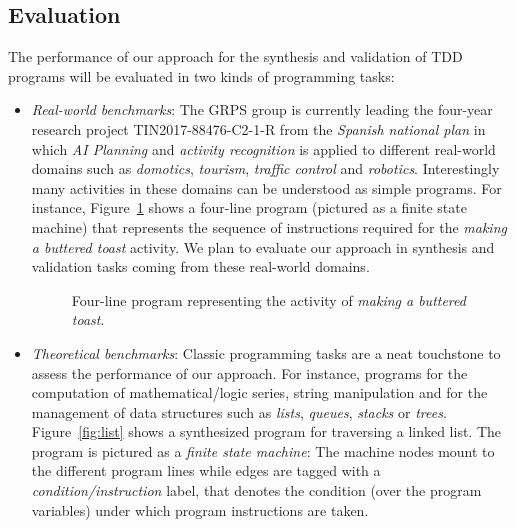 \documentclass[10pt,a4paper]{paper}
\begin{document}
\subsection{Evaluation}
\label{sec:evaluation}
The performance of our approach for the synthesis and validation of TDD programs will be evaluated in two kinds of programming tasks:
\begin{itemize}
\item {\em Real-world benchmarks}: The GRPS group is currently leading the four-year research project TIN2017-88476-C2-1-R from the {\em Spanish national plan} in which {\em AI Planning} and {\em activity recognition} is applied to different real-world domains such as {\em domotics}, {\em tourism}, {\em traffic control} and {\em robotics}. Interestingly many activities in these domains can be understood as simple programs. For instance, Figure~\ref{fig:activity} shows a four-line program (pictured as a finite state machine) that represents the sequence of instructions required for the {\em making a buttered toast} activity. We plan to evaluate our approach in synthesis and validation tasks coming from these real-world domains. 

\begin{figure}[hbt!]
\begin{center}
\end{center}
\caption{\small Four-line program representing the activity of {\em making a buttered toast}.}
\label{fig:activity}
\end{figure}


\item {\em Theoretical benchmarks}: Classic programming tasks are a neat touchstone to assess the performance of our approach. For instance, programs for the computation of mathematical/logic series, string manipulation and for the management of data structures such as {\em lists}, {\em queues}, {\em stacks} or {\em trees}. Figure~\ref{fig:list} shows a synthesized program for traversing a linked list. The program is pictured as a {\em finite state machine}: The machine nodes mount to the different program lines while edges are tagged with a {\em condition/instruction} label, that denotes the condition (over the program variables) under which program instructions are taken.  
\end{itemize}
\end{document}
